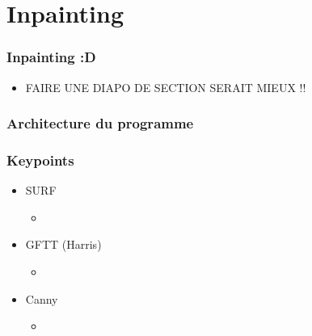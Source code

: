  \section{Inpainting}
\begin{frame}
  \frametitle{Inpainting :D}
  \begin{itemize}
  \item FAIRE UNE DIAPO DE SECTION SERAIT MIEUX !!
  \end{itemize}

\end{frame}



\begin{frame}
  \frametitle{Architecture du programme}


\end{frame}



\begin{frame}
  \frametitle{Keypoints}
  
  \begin{itemize}
  \item SURF
  	\begin{itemize}
  	\item
  	\end{itemize}
  	
  \item GFTT (Harris)
	\begin{itemize}
  	\item
  	\end{itemize}
  	
  \item Canny
    \begin{itemize}
  	\item
  	\end{itemize}
  	
  \end{itemize}


\end{frame}



